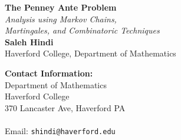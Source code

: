 \documentclass[12pt,haverford,landscape]{haverposter}
\begin{document}


\begin{minipage}[b]{0.55\linewidth}
\veryHuge \color{NavyBlue} \textbf{The Penney Ante Problem} \color{Black}\\ %
\Huge\textit{Analysis using Markov Chains, \\ Martingales, and Combinatoric Techniques}\\[1cm] %
\huge \textbf{Saleh Hindi}\\ %
\huge Haverford College, Department of Mathematics\\ %
\end{minipage}
%
\begin{minipage}[b]{0.25\linewidth}
\color{DarkSlateGray}\Large \textbf{Contact Information:}\\
Department of Mathematics\\ %
Haverford College\\
370 Lancaster Ave, Haverford PA\\\\
Email: \texttt{shindi@haverford.edu}\\ %
\end{minipage}
%
\begin{minipage}[b]{0.19\linewidth}
\end{minipage}
\end{document}
